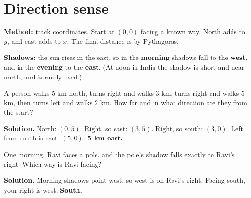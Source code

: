 \documentclass[11pt,a4paper,openany]{report}
\begin{document}
\section{Direction sense}
\begin{center}
\end{center}
\textbf{Method:} track coordinates. Start at $(0,0)$ facing a known way. North adds to $y$, and east adds to $x$. The final distance is by Pythagoras.

\textbf{Shadows:} the sun rises in the east, so in the \textbf{morning} shadows fall to the \textbf{west}, and in the \textbf{evening} to the \textbf{east}. (At noon in India the shadow is short and near north, and is rarely used.)

\begin{example}[walking]
A person walks 5 km north, turns right and walks 3 km, turns right and walks 5 km, then turns left and walks 2 km. How far and in what direction are they from the start?

\textbf{Solution.} North: $(0,5)$. Right, so east: $(3,5)$. Right, so south: $(3,0)$. Left from south is east: $(5,0)$. \textbf{5 km east.}
\end{example}

\begin{example}[shadow]
One morning, Ravi faces a pole, and the pole's shadow falls exactly to Ravi's right. Which way is Ravi facing?

\textbf{Solution.} Morning shadows point west, so west is on Ravi's right. Facing south, your right is west. \textbf{South.}
\end{example}
\end{document}
